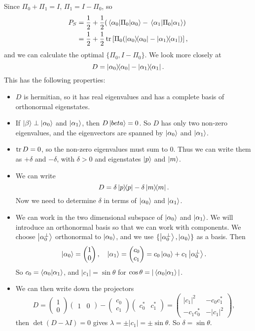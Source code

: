 \documentclass[a4paper]{article}
\begin{document}
Since $\Pi_0 + \Pi_1 = I$, $\Pi_1 = I - \Pi_0$, so
\begin{align*}
	P_S &= \frac{1}{2} + \frac{1}{2}(\ev{\Pi_0}{\alpha_0} - \ev{\Pi_0}{\alpha_1}) \\
		&= \frac{1}{2} + \frac{1}{2}\tr\left[\Pi_0 (\op{\alpha_0}{\alpha_0} - \op{\alpha_1}{\alpha_1})\right],
\end{align*}
and we can calculate the optimal $\{\Pi_0, I - \Pi_0\}$. We look more closely at
$$
D = \dyad{\alpha_0} - \dyad{\alpha_1}.
$$
This has the following properties:
\begin{itemize}
	\item $D$ is hermitian, so it has real eigenvalues and has a complete basis of orthonormal eigenstates.
	\item If $\ket{\beta} \perp \ket{\alpha_0}$ and $\ket{\alpha_1}$, then $D \ket{beta} = 0$. So $D$ has only two non-zero eigenvalues, and the eigenvectors are spanned by $\ket{\alpha_0}$ and $\ket{\alpha_1}$.
	\item $\tr D = 0$, so the non-zero eigenvalues must sum to $0$. Thus we can write them as $+ \delta$ and $- \delta$, with $\delta>0$ and eigenstates $\ket{p}$ and $\ket{m}$.
	\item We can write
	$$
	D = \delta \dyad {p} - \delta\dyad{m}.
	$$
	Now we need to determine $\delta$ in terms of $\ket{\alpha_0}$ and $\ket{\alpha_1}$.
	\item We can work in the two dimensional subspace of $\ket{\alpha_0}$ and $\ket{\alpha_1}$. We will introduce an orthonormal basis so that we can work with components. We choose $\ket{\alpha_0^{\perp}}$ orthonormal to $\ket{\alpha_0}$, and we use $\{\ket{\alpha_0^{\perp}}, \ket{\alpha_0}\}$ as a basis. Then
	$$
	\ket{\alpha_0} = \begin{pmatrix}
		1 \\ 0
	\end{pmatrix}, \quad \ket{\alpha_1} = \begin{pmatrix}
		c_0 \\c_1
	\end{pmatrix} = c_0 \ket{\alpha_0} + c_1 \ket{\alpha_0^{\perp}}.
	$$
	So $c_0 = \ip{\alpha_0}{\alpha_1}$, and $|c_1| = \sin \theta$ for $\cos \theta = |\ip{\alpha_0}{\alpha_1}|$.
	\item We can then write down the projectors
	$$
	D = \begin{pmatrix}
		1 \\ 0
	\end{pmatrix}\begin{pmatrix}
		1 & 0
	\end{pmatrix} - \begin{pmatrix}
		c_0 \\ c_1
	\end{pmatrix}\begin{pmatrix}
		c_0^* & c_1^*
	\end{pmatrix}  = \begin{pmatrix}
		|c_1|^2 & -c_0c_1^* \\
		-c_1 c_0^* & -|c_1|^2
	\end{pmatrix},
	$$
	then $\det(D - \lambda I) = 0$ gives $\lambda = \pm |c_1| = \pm \sin \theta$. So $\delta = \sin \theta$.
\end{itemize}
\end{document}
